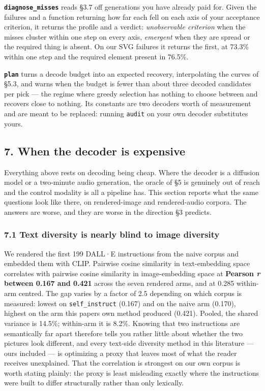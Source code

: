 \documentclass[
  10pt,
]{article}
\theoremstyle{plain}
\theoremstyle{definition}
\begin{document}
\textbf{\texttt{diagnose\_misses}} reads §3.7 off generations you have
already paid for. Given the failures and a function returning how far
each fell on each axis of your acceptance criterion, it returns the
profile and a verdict: \emph{unobservable criterion} when the misses
cluster within one step on every axis, \emph{emergent} when they are
spread or the required thing is absent. On our SVG failures it returns
the first, at 73.3\% within one step and the required element present in
76.5\%.

\textbf{\texttt{plan}} turns a decode budget into an expected recovery,
interpolating the curves of §5.3, and warns when the budget is fewer
than about three decoded candidates per pick --- the regime where greedy
selection has nothing to choose between and recovers close to nothing.
Its constants are two decoders\textquotesingle{} worth of measurement
and are meant to be replaced: running \texttt{audit} on your own decoder
substitutes yours.

\subsection{7. When the decoder is
expensive}\label{7-when-the-decoder-is-expensive}

Everything above rests on decoding being cheap. Where the decoder is a
diffusion model or a two-minute audio generation, the oracle of §5 is
genuinely out of reach and the control modality is all a pipeline has.
This section reports what the same questions look like there, on
rendered-image and rendered-audio corpora. The answers are worse, and
they are worse in the direction §3 predicts.

\subsubsection{7.1 Text diversity is nearly blind to image
diversity}\label{71-text-diversity-is-nearly-blind-to-image-diversity}

We rendered the first 199 DALL·E instructions from the naive corpus and
embedded them with CLIP. Pairwise cosine similarity in text-embedding
space correlates with pairwise cosine similarity in image-embedding
space at \textbf{Pearson \emph{r} between 0.167 and 0.421} across the
seven rendered arms, and at 0.285 within-arm centred. The gap varies by
a factor of 2.5 depending on which corpus is measured: lowest on
\texttt{self\_instruct} (0.167) and on the naive arm (0.170), highest on
the arm this paper\textquotesingle s own method produced (0.421).
Pooled, the shared variance is 14.5\%; within-arm it is 8.2\%. Knowing
that two instructions are semantically far apart therefore tells you
rather little about whether the two pictures look different, and every
text-side diversity method in this literature --- ours included --- is
optimizing a proxy that leaves most of what the reader receives
unexplained. That the correlation is strongest on our own corpus is
worth stating plainly: the proxy is least misleading exactly where the
instructions were built to differ structurally rather than only
lexically.
\end{document}
